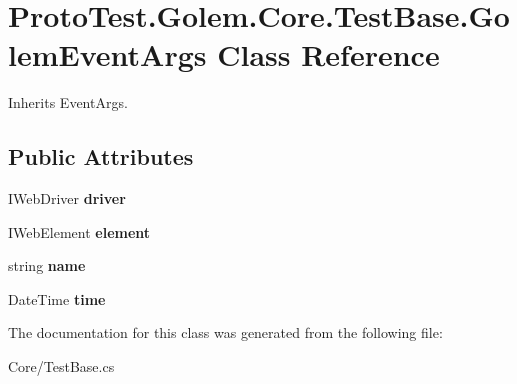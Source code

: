 \hypertarget{class_proto_test_1_1_golem_1_1_core_1_1_test_base_1_1_golem_event_args}{\section{Proto\-Test.\-Golem.\-Core.\-Test\-Base.\-Golem\-Event\-Args Class Reference}
\label{class_proto_test_1_1_golem_1_1_core_1_1_test_base_1_1_golem_event_args}
}


Inherits Event\-Args.

\subsection*{Public Attributes}
\begin{DoxyCompactItemize}
\item 
\hypertarget{class_proto_test_1_1_golem_1_1_core_1_1_test_base_1_1_golem_event_args_a4fb1ec101b0034937747d4514bb3f7ec}{I\-Web\-Driver {\bfseries driver}}\label{class_proto_test_1_1_golem_1_1_core_1_1_test_base_1_1_golem_event_args_a4fb1ec101b0034937747d4514bb3f7ec}

\item 
\hypertarget{class_proto_test_1_1_golem_1_1_core_1_1_test_base_1_1_golem_event_args_a2a99192ca75b5c9d507aa965db40aab3}{I\-Web\-Element {\bfseries element}}\label{class_proto_test_1_1_golem_1_1_core_1_1_test_base_1_1_golem_event_args_a2a99192ca75b5c9d507aa965db40aab3}

\item 
\hypertarget{class_proto_test_1_1_golem_1_1_core_1_1_test_base_1_1_golem_event_args_a5d6755675f07c55a8dedaa8ebff2636f}{string {\bfseries name}}\label{class_proto_test_1_1_golem_1_1_core_1_1_test_base_1_1_golem_event_args_a5d6755675f07c55a8dedaa8ebff2636f}

\item 
\hypertarget{class_proto_test_1_1_golem_1_1_core_1_1_test_base_1_1_golem_event_args_a9673e5660ab8b0cb9a10e477204ae9e3}{Date\-Time {\bfseries time}}\label{class_proto_test_1_1_golem_1_1_core_1_1_test_base_1_1_golem_event_args_a9673e5660ab8b0cb9a10e477204ae9e3}

\end{DoxyCompactItemize}


The documentation for this class was generated from the following file\-:\begin{DoxyCompactItemize}
\item 
Core/Test\-Base.\-cs\end{DoxyCompactItemize}
